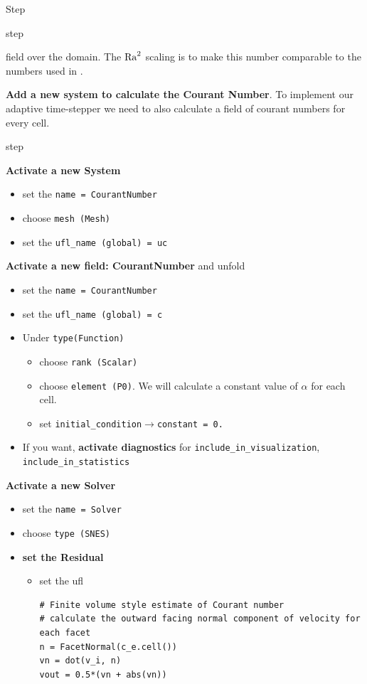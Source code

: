 \begin{steps}{Step}
\begin{steps}{step}
\begin{itemize}
\begin{itemize}
 field over the domain.  The $\mathrm{Ra}^{2}$ scaling is to make this number
 comparable to the numbers used in \cite{blankenbach_benchmark_1989}.
      \end{itemize}
    \end{itemize}
\end{steps}
  \item \textbf{Add a new system to calculate the Courant Number}.  To
    implement our adaptive time-stepper we need to also calculate a
    field of courant numbers for every cell.
    \begin{steps}{step}
    \item \textbf{Activate a new System} 
      \begin{itemize}
      \item set the \texttt{name = CourantNumber}
      \item choose \texttt{mesh (Mesh)}
      \item set the \texttt{ufl\_name (global) = uc}
      \end{itemize}
    \item \textbf{Activate a new field: CourantNumber} and unfold
     \begin{itemize}
      \item set the \texttt{name = CourantNumber}
      \item set the \texttt{ufl\_name (global) = c}
      \item Under \texttt{type(Function)}
        \begin{itemize}
        \item choose \texttt{rank (Scalar)}
        \item choose \texttt{element (P0)}. We will calculate a
          constant value of $\alpha$ for each cell.
        \item set \texttt{initial\_condition}$\rightarrow$\texttt{constant = 0.}
        \end{itemize}
      \item If you want, \textbf{activate diagnostics} for
        \texttt{include\_in\_visualization}, \texttt{include\_in\_statistics}
      \end{itemize}
      
    \item \textbf{Activate a new Solver}
\begin{itemize}
      \item set the \texttt{name = Solver}
      \item choose \texttt{type (SNES)}
      \item \textbf{set the Residual}
        \begin{itemize}
        \item set the ufl 
\begin{lstlisting}[style=UFL]
# Finite volume style estimate of Courant number
# calculate the outward facing normal component of velocity for each facet
n = FacetNormal(c_e.cell())
vn = dot(v_i, n)
vout = 0.5*(vn + abs(vn))


\end{lstlisting}
\end{itemize}
\end{itemize}
\end{steps}
\end{steps}
